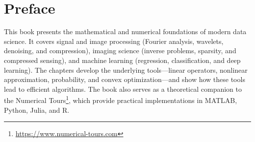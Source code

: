 
\chapter*{Preface}

	This book presents the mathematical and numerical foundations of modern data science.
	It covers signal and image processing (Fourier analysis, wavelets, denoising, and compression), imaging science (inverse problems, sparsity, and compressed sensing), and machine learning (regression, classification, and deep learning).
	The chapters develop the underlying tools---linear operators, nonlinear approximation, probability, and convex optimization---and show how these tools lead to efficient algorithms.
	The book also serves as a theoretical companion to the Numerical Tours\footnote{\url{https://www.numerical-tours.com}}, which provide practical implementations in MATLAB, Python, Julia, and R.
		





\tableofcontents
